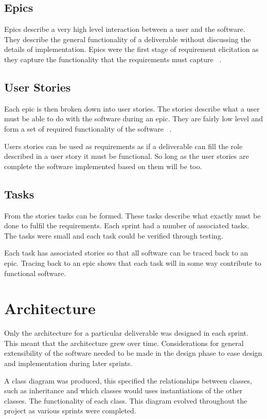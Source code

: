 \documentclass{UoYCSproject}
\begin{document}
\subsection{Epics}
Epics describe a very high level interaction between a user and the software. They describe the general functionality of a deliverable without discussing the details of implementation. Epics were the first stage of requirement elicitation as they capture the functionality that the requirements must capture ~\parencite{cohn2004user}.

\subsection{User Stories}
Each epic is then broken down into user stories. The stories describe what a user must be able to do with the software during an epic. They are fairly low level and form a set of required functionality of the software ~\parencite{cohn2004user}.

Users stories can be used as requirements as if a deliverable can fill the role described in a user story it must be functional. So long as the user stories are complete the software implemented based on them will be too.

\subsection{Tasks}
From the stories tasks can be formed. These tasks describe what exactly must be done to fulfil the requirements. Each sprint had a number of associated tasks. The tasks were small and each task could be verified through testing. 

Each task has associated stories so that all software can be traced back to an epic. Tracing back to an epic shows that each task will in some way contribute to functional software.
\section{Architecture}
Only the architecture for a particular deliverable was designed in each sprint. This meant that the architecture grew over time. Considerations for general extensibility of the software needed to be made in the design phase to ease design and implementation during later sprints.

A class diagram was produced, this specified the relationships between classes, such as inheritance and which classes would uses instantiations of the other classes.  The functionality of each class. This diagram evolved throughout the project as various sprints were completed.
\end{document}
